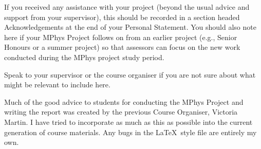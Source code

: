 \documentclass[12pt]{article}
\begin{document}
\acknowledgments

\begin{it}
If you received any assistance with your project (beyond the usual advice and support from your supervisor), this should be recorded in a section headed Acknowledgements at the end of your Personal Statement. You should also note here if your MPhys Project follows on from an earlier project (e.g., Senior Honours or a summer project) so that assessors can focus on the new work conducted during the MPhys project study period.

Speak to your supervisor or the course organiser if you are not sure about what might be relevant to include here.
\end{it}

Much of the good advice to students for conducting the MPhys Project and writing the report was created by the previous Course Organiser, Victoria Martin. I have tried to incorporate as much as this as possible into the current generation of course materials. Any bugs in the \LaTeX\ style file are entirely my own.


\maintext












\appendix



\newpage
\printbibliography
\end{document}
